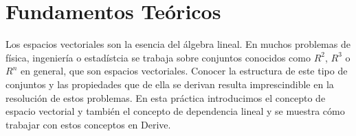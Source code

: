 \documentclass[a4paper]{article}
\begin{document}
\sloppy {}

\bigskip
\section*{Fundamentos Teóricos}
Los espacios vectoriales son la esencia del álgebra lineal. En muchos problemas de física, ingeniería o estadístcia se trabaja sobre conjuntos conocidos como $R^2$, $R^3$ o $R^n$ en general, que son espacios vectoriales. Conocer la estructura de este tipo de conjuntos y las propiedades que de ella se derivan resulta imprescindible en la resolución de estos problemas. En esta práctica introducimos el concepto de espacio vectorial y también el concepto de dependencia lineal y se muestra cómo trabajar con estos conceptos en Derive. 
\end{document}
